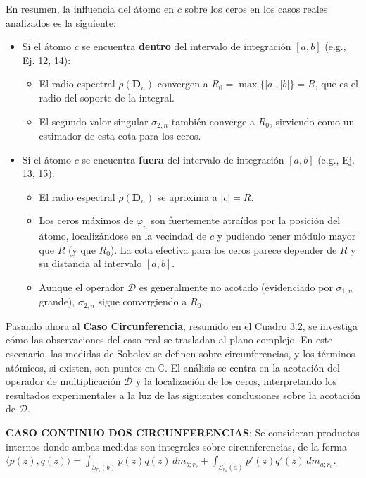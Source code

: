 En resumen, la influencia del átomo en $c$ sobre los ceros en los casos reales analizados es la siguiente:
\begin{itemize}
  \item Si el átomo $c$ se encuentra \textbf{dentro} del intervalo de integración $[a,b]$ (e.g., Ej. 12, 14):
        \begin{itemize}
          \item El radio espectral $\rho(\mathbf{D}_n)$ convergen a $R_0 = \max\{|a|,|b|\} = R$, que es el radio del soporte de la integral.
          \item El segundo valor singular $\sigma_{2,n}$ también converge a $R_0$, sirviendo como un estimador de esta cota para los ceros.
        \end{itemize}
  \item Si el átomo $c$ se encuentra \textbf{fuera} del intervalo de integración $[a,b]$ (e.g., Ej. 13, 15):
        \begin{itemize}
          \item El radio espectral $\rho(\mathbf{D}_n)$ se aproxima a $|c|=R$.
          \item Los ceros máximos de $\varphi_n$ son fuertemente atraídos por la posición del átomo, localizándose en la vecindad de $c$ y pudiendo tener módulo mayor que $R$ (y que $R_0$). La cota efectiva para los ceros parece depender de $R$ y su distancia al intervalo $[a,b]$.
          \item Aunque el operador $\mathcal{D}$ es generalmente no acotado (evidenciado por $\sigma_{1,n}$ grande), $\sigma_{2,n}$ sigue convergiendo a $R_0$.
        \end{itemize}
\end{itemize}

Pasando ahora al \textbf{Caso Circunferencia}, resumido en el Cuadro 3.2, se investiga cómo las observaciones del caso real se trasladan al plano complejo. En este escenario, las medidas de Sobolev se definen sobre circunferencias, y los términos atómicos, si existen, son puntos en $\mathbb{C}$. El análisis se centra en la acotación del operador de multiplicación $\mathcal{D}$ y la localización de los ceros, interpretando los resultados experimentales a la luz de las siguientes conclusiones sobre la acotación de $\mathcal{D}$.

\noindent \textbf{CASO CONTINUO DOS CIRCUNFERENCIAS}: Se consideran productos internos donde ambas medidas son integrales sobre circunferencias, de la forma $\langle p(z),q(z) \rangle=\int_{S_{r_b}(b)} p(z)\overline{q(z)}\, dm_{b;r_b} + \int_{S_{r_a}(a)} p'(z)\overline{q'(z)}\, dm_{a;r_a}$.

